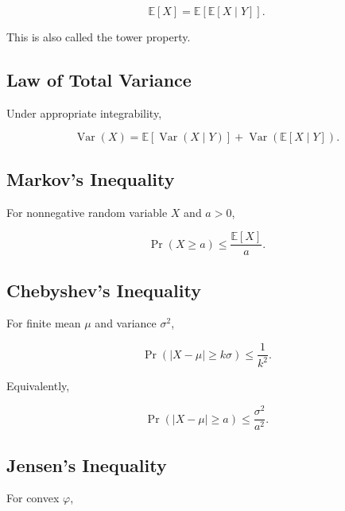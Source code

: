 \[
\boxed{
\mathbb{E}[X]
=
\mathbb{E}
[
\mathbb{E}[X\mid Y]
].
}
\]

This is also called the tower property.

\subsection{Law of Total Variance}
\label{subsec:total-variance-summary}

Under appropriate integrability,

\[
\boxed{
\operatorname{Var}(X)
=
\mathbb{E}
[
\operatorname{Var}(X\mid Y)
]
+
\operatorname{Var}
(
\mathbb{E}[X\mid Y]
).
}
\]

\subsection{Markov's Inequality}
\label{subsec:markov-inequality-summary}

For nonnegative random variable \(X\) and \(a>0\),

\[
\boxed{
\Pr(X\geq a)
\leq
\frac{
\mathbb{E}[X]
}{
a
}.
}
\]

\subsection{Chebyshev's Inequality}
\label{subsec:chebyshev-inequality-summary}

For finite mean \(\mu\) and variance \(\sigma^2\),

\[
\boxed{
\Pr(
|X-\mu|
\geq
k\sigma
)
\leq
\frac1{k^2}.
}
\]

Equivalently,

\[
\boxed{
\Pr(
|X-\mu|
\geq
a
)
\leq
\frac{
\sigma^2
}{
a^2
}.
}
\]

\subsection{Jensen's Inequality}
\label{subsec:jensen-inequality-summary}

For convex \(\varphi\),

